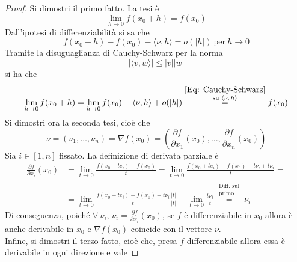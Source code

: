     \begin{proof}
        Si dimostri il primo fatto. La tesi è
        \begin{equation}
            \lim_{h \to 0}{f(x_0+h)}=f(x_0)
        \end{equation}
        Dall'ipotesi di differenziabilità si sa che
        \begin{equation}
            f(x_0+h)-f(x_0)-\langle \nu, h \rangle = o(|h|)\ \text{per}\ h \to 0
        \end{equation}
        Tramite la disuguaglianza di Cauchy-Schwarz per la norma
        \begin{equation} \label{Eq: Cauchy-Schwarz}
            | \langle \underline{v}, \underline{w} \rangle | \leq |\underline{v}||\underline{w}|
        \end{equation}
        si ha che 
        \begin{equation}
            \lim_{h \to 0}{f(x_0+h)}= \lim_{h \to 0} {f(x_0)+ \langle \nu, h \rangle + o(|h|)}\overset{\substack{\ref{Eq: Cauchy-Schwarz}\\ \text{su $\langle \nu, h \rangle$}}}{=} f(x_0)
        \end{equation}
        Si dimostri ora la seconda tesi, cioè che 
        \begin{equation}
            \nu=(\nu_1, \dots, \nu_n)= \nabla f(x_0) = \left(\frac{\partial{f}}{\partial{x_1}}{(x_0)}, \dots, \frac{\partial{f}}{\partial{x_n}}{(x_0)}\right)
        \end{equation}
        Sia $i \in [1, n]$ fissato. La definizione di derivata parziale è
        \begin{equation}
            \begin{aligned}
               \frac{\partial{f}}{\partial{x_i}}(x_0)&=\lim_{t \to 0}{\frac{f(x_0+te_i)-f(x_0)}{t}}=\lim_{t \to 0}{\frac{f(x_0+te_i)-f(x_0)-t\nu_i+t\nu_i}{t}}=\\
               &=\lim_{t \to 0}{\frac{f(x_0+te_i)-f(x_0)-t\nu_i}{t} \frac{|t|}{|t|}}+\lim_{t \to 0}{\frac{t\nu_i}{t}}\overset{\substack{\text{Diff. sul}\\\text{primo}}}{=} \nu_i
            \end{aligned}
        \end{equation}
        Di conseguenza, poiché $\forall\ \nu_i$, $\nu_i=\frac{\partial{f}}{\partial{x_i}}(x_0)$, se $f$ è differenziabile in $x_0$ allora è anche derivabile in $x_0$ e $\nabla f(x_0)$ coincide con il vettore $\nu$.\\
        Infine, si dimostri il terzo fatto, cioè che, presa $f$ differenziabile allora essa è derivabile in ogni direzione e vale

\end{proof}
